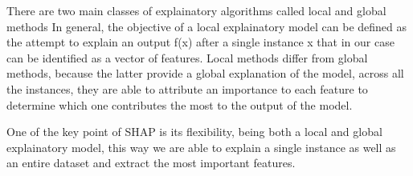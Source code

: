 \documentclass[11pt]{report}
\begin{document}
There are two main classes of explainatory algorithms called local and global methods
In general, the objective of a local explainatory model can be defined as the attempt to explain an output f(x) after a single instance x that in our case can be identified as a vector of features.
Local methods differ from global methods, because the latter provide a global explanation of the model, across all the instances, they are able to attribute an importance to each feature to determine which one contributes the most to the output of the model.

One of the key point of SHAP is its flexibility, being both a local and global explainatory model, this way we are able to explain a single instance as well as an entire dataset and extract the most important features.
\end{document}

